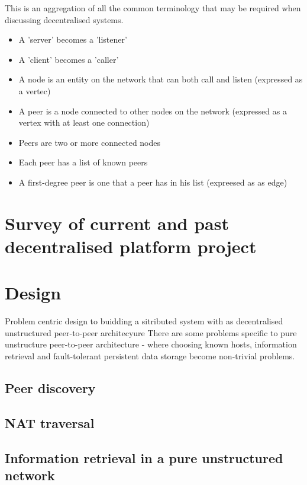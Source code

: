 \documentclass[a4paper]{article}
\begin{document}
This is an aggregation of all the common terminology that may be required when discussing decentralised systems.
\begin{itemize}
    \item A 'server' becomes a 'listener'
    \item A 'client' becomes a 'caller'
    \item A node is an entity on the network that can both call and listen (expressed as a vertec)
    \item A peer is a node connected to other nodes on the network (expressed as a vertex with at least one connection)
    \item Peers are two or more connected nodes
    \item Each peer has a list of known peers
    \item A first-degree peer is one that a peer has in his list (expreesed as as edge)
\end{itemize}

\section{Survey of current and past decentralised platform project}

\section{Design}
Problem centric design to buidding a sitributed system with as decentralised unstructured peer-to-peer architecyure
There are some problems specific to pure unstructure peer-to-peer architecture - where choosing known hosts, information retrieval and fault-tolerant persistent data storage become non-trivial problems.
\subsection{Peer discovery}
\subsection{NAT traversal}
\subsection{Information retrieval in a pure unstructured network}
\end{document}
